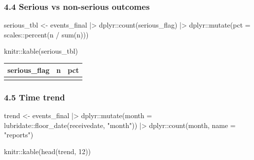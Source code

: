 \documentclass[
  letterpaper,
  DIV=11,
  numbers=noendperiod]{scrartcl}
\newenvironment{Shaded}{\begin{snugshade}}{\end{snugshade}}
\newcommand{\AttributeTok}[1]{\textcolor[rgb]{0.40,0.45,0.13}{#1}}
\newcommand{\DecValTok}[1]{\textcolor[rgb]{0.68,0.00,0.00}{#1}}
\newcommand{\FunctionTok}[1]{\textcolor[rgb]{0.28,0.35,0.67}{#1}}
\newcommand{\NormalTok}[1]{\textcolor[rgb]{0.00,0.23,0.31}{#1}}
\newcommand{\OtherTok}[1]{\textcolor[rgb]{0.00,0.23,0.31}{#1}}
\newcommand{\SpecialCharTok}[1]{\textcolor[rgb]{0.37,0.37,0.37}{#1}}
\newcommand{\StringTok}[1]{\textcolor[rgb]{0.13,0.47,0.30}{#1}}
\begin{document}
\subsubsection{4.4 Serious vs non-serious
outcomes}\label{serious-vs-non-serious-outcomes}

\begin{Shaded}
\begin{Highlighting}[]
\NormalTok{serious\_tbl }\OtherTok{\textless{}{-}}\NormalTok{ events\_final }\SpecialCharTok{|\textgreater{}}
\NormalTok{  dplyr}\SpecialCharTok{::}\FunctionTok{count}\NormalTok{(serious\_flag) }\SpecialCharTok{|\textgreater{}}
\NormalTok{  dplyr}\SpecialCharTok{::}\FunctionTok{mutate}\NormalTok{(}\AttributeTok{pct =}\NormalTok{ scales}\SpecialCharTok{::}\FunctionTok{percent}\NormalTok{(n }\SpecialCharTok{/} \FunctionTok{sum}\NormalTok{(n)))}

\NormalTok{knitr}\SpecialCharTok{::}\FunctionTok{kable}\NormalTok{(serious\_tbl)}
\end{Highlighting}
\end{Shaded}

\begin{longtable}[]{@{}lrl@{}}
\toprule\noalign{}
serious\_flag & n & pct \\
\midrule\noalign{}
\endhead
\bottomrule\noalign{}
\endlastfoot
\end{longtable}

\subsubsection{4.5 Time trend}\label{time-trend}

\begin{Shaded}
\begin{Highlighting}[]
\NormalTok{trend }\OtherTok{\textless{}{-}}\NormalTok{ events\_final }\SpecialCharTok{|\textgreater{}}
\NormalTok{  dplyr}\SpecialCharTok{::}\FunctionTok{mutate}\NormalTok{(}\AttributeTok{month =}\NormalTok{ lubridate}\SpecialCharTok{::}\FunctionTok{floor\_date}\NormalTok{(receivedate, }\StringTok{"month"}\NormalTok{)) }\SpecialCharTok{|\textgreater{}}
\NormalTok{  dplyr}\SpecialCharTok{::}\FunctionTok{count}\NormalTok{(month, }\AttributeTok{name =} \StringTok{"reports"}\NormalTok{)}

\NormalTok{knitr}\SpecialCharTok{::}\FunctionTok{kable}\NormalTok{(}\FunctionTok{head}\NormalTok{(trend, }\DecValTok{12}\NormalTok{))}
\end{Highlighting}
\end{Shaded}
\end{document}
